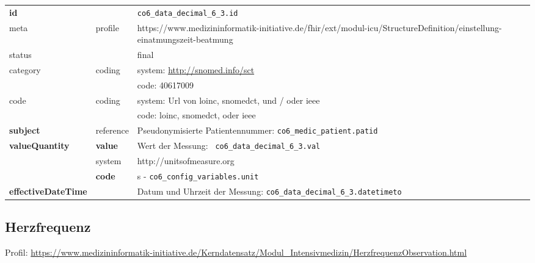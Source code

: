 \begin{longtable}{|l|l|p{7.5cm}|}
        \hline
        \rowcolor{lightgray} \multicolumn{3}{|l|}{Data Mapping (inhaltlich)} \\ \hline
        \textbf{id} &  & \texttt{co6\_data\_decimal\_6\_3.id} \\ \hline
	meta & profile & https://www.medizininformatik-initiative.de/fhir/ext/modul-icu/StructureDefinition/einstellung-einatmungszeit-beatmung \\ \hline 
	status &  & final   \\ \hline 
	category & coding & system: \url{http://snomed.info/sct} \\
\cline{3-3}
	& & code: 40617009\\ \hline
	code & coding & system: Url von \ac{loinc}, \ac{snomedct}, und / oder \ac{ieee} \\ 
	\cline{3-3} 
	 &  & code: \ac{loinc}, \ac{snomedct}, oder \ac{ieee} \\ \hline
	 \textbf{subject}  & reference & Pseudonymisierte Patientennummer: \texttt{co6\_medic\_patient.patid} \\ \hline
	 \textbf{valueQuantity}  & \textbf{value} & Wert der Messung: \texttt{
co6\_data\_decimal\_6\_3.val} \\
        \cline{2-3}
         & system & http://unitsofmeasure.org \\
         \cline{2-3}
         & \textbf{code} & s - \texttt{co6\_config\_variables.unit} \\ \hline
     \textbf{effectiveDateTime}  & & Datum und Uhrzeit der Messung: \texttt{co6\_data\_decimal\_6\_3.datetimeto} \\ \hline
\end{longtable}

\subsection{Herzfrequenz} 

Profil: \url{https://www.medizininformatik-initiative.de/Kerndatensatz/Modul_Intensivmedizin/HerzfrequenzObservation.html}

